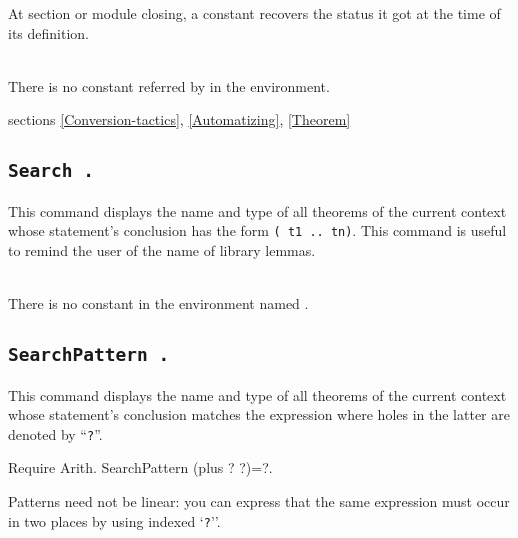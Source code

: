 At section or module closing, a constant recovers the status it got at
the time of its definition.


\begin{ErrMsgs}
\item {}\\
    There is no constant referred by {\qualid} in the environment.
\end{ErrMsgs}

\SeeAlso sections \ref{Conversion-tactics}, \ref{Automatizing},
\ref{Theorem}

\subsection{\tt Search {\qualid}.}
This command displays the name and type of all theorems of the current
context whose statement's conclusion has the form {\tt ({\qualid} t1 ..
  tn)}.  This command is useful to remind the user of the name of
library lemmas.
\begin{ErrMsgs}
\item {}\\
    There is no constant in the environment named
    \qualid.
\end{ErrMsgs}

\subsection{\tt SearchPattern {\term}.}

This command displays the name and type of all theorems of the current
context whose statement's conclusion matches the expression {\term}
where holes in the latter are denoted by ``{\texttt ?}''.

\begin{coq_example}
Require Arith.
SearchPattern (plus ? ?)=?.
\end{coq_example}

Patterns need not be linear: you can express that the same
expression must occur in two places by using indexed `{\texttt ?}''.

